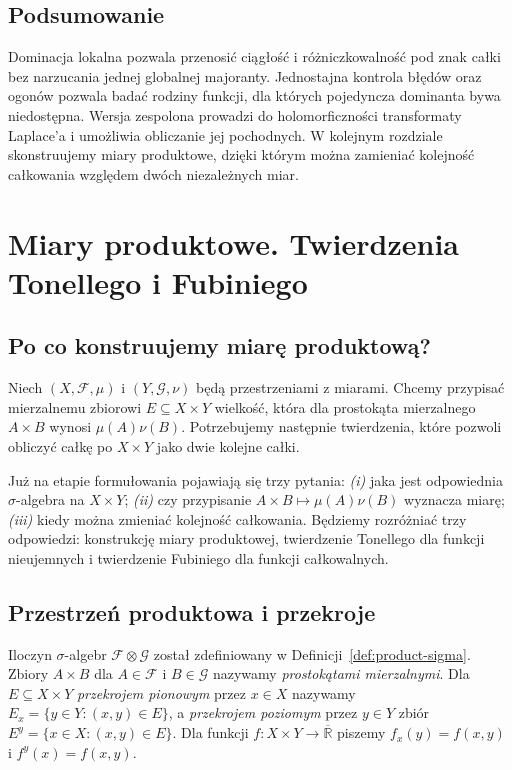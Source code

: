 \documentclass[11pt,a4paper,oneside]{book}
\numberwithin{equation}{chapter}
\theoremstyle{plain}
\theoremstyle{definition}
\theoremstyle{remark}
\begin{document}
\section{Podsumowanie}
Dominacja lokalna pozwala przenosić ciągłość i
różniczkowalność pod znak całki bez narzucania
jednej globalnej majoranty. Jednostajna kontrola
błędów oraz ogonów pozwala badać rodziny funkcji,
dla których pojedyncza dominanta bywa niedostępna.
Wersja zespolona prowadzi do holomorficzności
transformaty Laplace'a i umożliwia obliczanie jej
pochodnych. W kolejnym rozdziale skonstruujemy
miary produktowe, dzięki którym można zamieniać
kolejność całkowania względem dwóch niezależnych
miar.



\chapter{Miary produktowe. Twierdzenia Tonellego i Fubiniego}
\label{ch:produkty-miary}

\section{Po co konstruujemy miarę produktową?}

Niech $(X,\mathcal F,\mu)$ i $(Y,\mathcal G,\nu)$ będą
przestrzeniami z miarami. Chcemy przypisać mierzalnemu
zbiorowi $E\subseteq X\times Y$ wielkość, która dla
prostokąta mierzalnego $A\times B$ wynosi $\mu(A)\nu(B)$.
Potrzebujemy następnie twierdzenia, które pozwoli obliczyć
całkę po $X\times Y$ jako dwie kolejne całki.

Już na etapie formułowania pojawiają się trzy pytania:
\emph{(i)} jaka jest odpowiednia $\sigma$-algebra
na $X\times Y$; \emph{(ii)} czy przypisanie
$A\times B\mapsto\mu(A)\nu(B)$ wyznacza miarę;
\emph{(iii)} kiedy można zmieniać kolejność całkowania.
Będziemy rozróżniać trzy odpowiedzi: konstrukcję miary
produktowej, twierdzenie Tonellego dla funkcji nieujemnych
i twierdzenie Fubiniego dla funkcji całkowalnych.

\section{Przestrzeń produktowa i przekroje}

Iloczyn $\sigma$-algebr $\mathcal F\otimes\mathcal G$
został zdefiniowany w Definicji~\ref{def:product-sigma}.
Zbiory $A\times B$ dla $A\in\mathcal F$ i $B\in\mathcal G$
nazywamy \emph{prostokątami mierzalnymi}.
Dla $E\subseteq X\times Y$ \emph{przekrojem pionowym}
przez $x\in X$ nazywamy $E_x=\{y\in Y:(x,y)\in E\}$,
a \emph{przekrojem poziomym} przez $y\in Y$ zbiór
$E^y=\{x\in X:(x,y)\in E\}$.
Dla funkcji $f:X\times Y\to\overline{\mathbb R}$ piszemy
$f_x(y)=f(x,y)$ i $f^y(x)=f(x,y)$.
\end{document}

